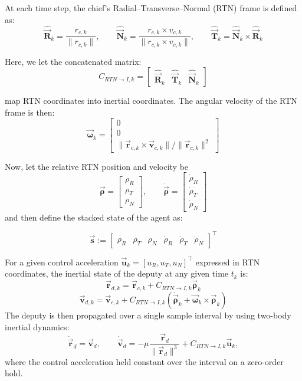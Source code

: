 At each time step, the chief's Radial--Transverse--Normal (RTN) frame is defined as:
\[
\hat{\vec{\mathbf{R}}}_k = \frac{r_{c,k}}{\|r_{c,k}\|},
\qquad
\hat{\vec{\mathbf{N}}}_k =
\frac{r_{c,k}\times v_{c,k}}
     {\|r_{c,k}\times v_{c,k}\|},
\qquad
\hat{\vec{\mathbf{T}}}_k = \hat{\vec{\mathbf{N}}}_k \times \hat{\vec{\mathbf{R}}}_k
\]

Here, we let the concatenated matrix:
\[
C_{RTN\to I,k}
=
\begin{bmatrix}
\hat{\vec{\mathbf{R}}}_k & \hat{\vec{\mathbf{T}}}_k & \hat{\vec{\mathbf{N}}}_k
\end{bmatrix}
\]

map RTN coordinates into inertial coordinates. The angular velocity of the RTN frame is then:
\[
\vec{\boldsymbol{\omega}}_k =
\begin{bmatrix}
0\\
0\\
\|\vec{\mathbf{r}}_{c,k}\times \vec{\mathbf{v}}_{c,k}\|/\|\vec{\mathbf{r}}_{c,k}\|^2
\end{bmatrix}
\]

Now, let the relative RTN position and velocity be
\[
\vec{\boldsymbol{\rho}} =
\begin{bmatrix}
\rho_R\\
\rho_T\\
\rho_N
\end{bmatrix},
\qquad
\dot{\vec{\boldsymbol{\rho}}} =
\begin{bmatrix}
\dot{\rho}_R\\
\dot{\rho}_T\\
\dot{\rho}_N
\end{bmatrix}
\]
and then define the stacked state of the agent as:

\[
\vec{\mathbf{s}} :=
\begin{bmatrix}
\rho_R &
\rho_T &
\rho_N &
\dot{\rho}_R &
\dot{\rho}_T &
\dot{\rho}_N
\end{bmatrix}^{\top}
\]

For a given control acceleration $
\vec{\mathbf{u}}_k = [u_R, u_T, u_N]^\top$ expressed in RTN coordinates, the inertial state of the deputy at any given time $t_k$ is:
\[
\vec{\mathbf{r}}_{d,k} = \vec{\mathbf{r}}_{c,k} + C_{RTN \to I,k}\vec{\boldsymbol{\rho}}_k
\]
\[
\vec{\mathbf{v}}_{d,k} = \vec{\mathbf{v}}_{c,k} + C_{RTN \to I,k}(\dot{\vec{\boldsymbol{\rho}}}_k + \vec{\boldsymbol{\omega}}_k \times \vec{\boldsymbol{\rho}}_k)
\]
The deputy is then propagated over a single sample interval by using two-body inertial dynamics:
\[
\dot{\vec{\mathbf{r}}}_d = \vec{\mathbf{v}}_d,
\qquad
\dot{\vec{\mathbf{v}}}_d = -\mu \frac{\vec{\mathbf{r}}_d}{ \|\vec{\mathbf{r}}_d\|^3} + C_{RTN \to I,k}\vec{\mathbf{u}}_k,
\]
where the control acceleration held constant over the interval on a zero-order hold.

